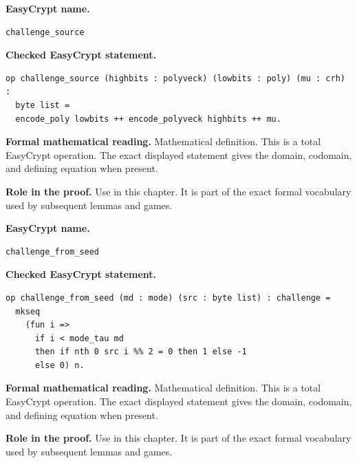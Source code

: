 \begin{formaldefinition}
\noindent\textbf{EasyCrypt name.}
\begin{lstlisting}[language=EasyCrypt,basicstyle=\ttfamily\scriptsize]
challenge_source
\end{lstlisting}
\noindent\textbf{Checked EasyCrypt statement.}
\begin{lstlisting}[language=EasyCrypt,basicstyle=\ttfamily\scriptsize]
op challenge_source (highbits : polyveck) (lowbits : poly) (mu : crh) :
  byte list =
  encode_poly lowbits ++ encode_polyveck highbits ++ mu.
\end{lstlisting}
\noindent\textbf{Formal mathematical reading.}
Mathematical definition. This is a total EasyCrypt operation.  The exact displayed statement gives the domain, codomain, and defining equation when present.

\noindent\textbf{Role in the proof.}
Use in this chapter. It is part of the exact formal vocabulary used by subsequent lemmas and games.

\end{formaldefinition}

\begin{formaldefinition}
\noindent\textbf{EasyCrypt name.}
\begin{lstlisting}[language=EasyCrypt,basicstyle=\ttfamily\scriptsize]
challenge_from_seed
\end{lstlisting}
\noindent\textbf{Checked EasyCrypt statement.}
\begin{lstlisting}[language=EasyCrypt,basicstyle=\ttfamily\scriptsize]
op challenge_from_seed (md : mode) (src : byte list) : challenge =
  mkseq
    (fun i =>
      if i < mode_tau md
      then if nth 0 src i %% 2 = 0 then 1 else -1
      else 0) n.
\end{lstlisting}
\noindent\textbf{Formal mathematical reading.}
Mathematical definition. This is a total EasyCrypt operation.  The exact displayed statement gives the domain, codomain, and defining equation when present.

\noindent\textbf{Role in the proof.}
Use in this chapter. It is part of the exact formal vocabulary used by subsequent lemmas and games.

\end{formaldefinition}

